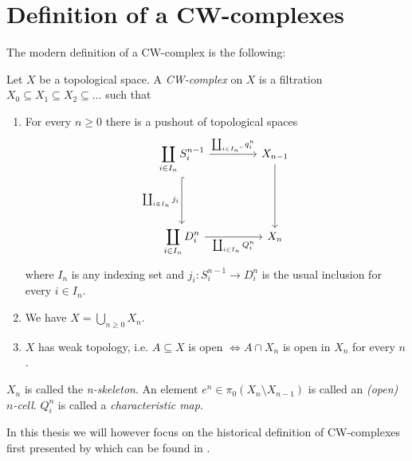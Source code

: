 \section{Definition of a CW-complexes}

The modern definition of a CW-complex is the following: 

\begin{defi}\label{defi:CWComplex1}
    Let $X$ be a topological space. 
    A \emph{CW-complex} on $X$ is a filtration 
    $X_0 \subseteq X_1 \subseteq X_2 \subseteq \dots$ such that 
    \begin{enumerate}
        \item For every $n \ge 0$ there is a pushout of topological spaces
            \[
            \begin{tikzcd}[row sep = 1.5cm, column sep = 1.5cm]
                \displaystyle \coprod_{i \in I_n}S_i^{n - 1} \arrow[r, "\coprod_{i \in I_n"}q_i^n"] \arrow[d, hook, "\coprod_{i \in I_n} j_i"'] & X_{n- 1} \arrow[d] \\ 
                \displaystyle \coprod_{i \in I_n}D_i^n \arrow[r, "\coprod_{i \in I_n} Q_i^n"'] & X_n
            \end{tikzcd}
            \] 
            where $I_n$ is any indexing set and $j_i \colon S_i^{n - 1} \to D_i^n$ is the usual inclusion for every $i \in I_n$.
        \item We have $X = \bigcup_{n \ge 0} X_n$. 
        \item $X$ has weak topology, i.e. $A \subseteq X$ is open $\iff A \cap X_n$ is open in $X_n$ for every $n$.
    \end{enumerate}
    $X_n$ is called the \emph{n-skeleton}. 
    An element $e^n \in \pi_0 (X_n \setminus X_{n - 1})$ is called an \emph{(open) $n$-cell}. 
    $Q_i^n$ is called a \emph{characteristic map}.
\end{defi}


In this thesis we will however focus on the historical definition of CW-complexes first presented by  which can be found in \cite{Whitehead2018}.

